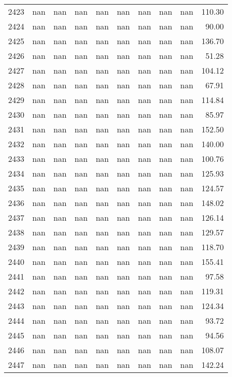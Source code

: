 \begin{tabular}{lrrrrrrrrr}
2423 & nan & nan & nan & nan & nan & nan & nan & nan & 110.30 \\
2424 & nan & nan & nan & nan & nan & nan & nan & nan & 90.00 \\
2425 & nan & nan & nan & nan & nan & nan & nan & nan & 136.70 \\
2426 & nan & nan & nan & nan & nan & nan & nan & nan & 51.28 \\
2427 & nan & nan & nan & nan & nan & nan & nan & nan & 104.12 \\
2428 & nan & nan & nan & nan & nan & nan & nan & nan & 67.91 \\
2429 & nan & nan & nan & nan & nan & nan & nan & nan & 114.84 \\
2430 & nan & nan & nan & nan & nan & nan & nan & nan & 85.97 \\
2431 & nan & nan & nan & nan & nan & nan & nan & nan & 152.50 \\
2432 & nan & nan & nan & nan & nan & nan & nan & nan & 140.00 \\
2433 & nan & nan & nan & nan & nan & nan & nan & nan & 100.76 \\
2434 & nan & nan & nan & nan & nan & nan & nan & nan & 125.93 \\
2435 & nan & nan & nan & nan & nan & nan & nan & nan & 124.57 \\
2436 & nan & nan & nan & nan & nan & nan & nan & nan & 148.02 \\
2437 & nan & nan & nan & nan & nan & nan & nan & nan & 126.14 \\
2438 & nan & nan & nan & nan & nan & nan & nan & nan & 129.57 \\
2439 & nan & nan & nan & nan & nan & nan & nan & nan & 118.70 \\
2440 & nan & nan & nan & nan & nan & nan & nan & nan & 155.41 \\
2441 & nan & nan & nan & nan & nan & nan & nan & nan & 97.58 \\
2442 & nan & nan & nan & nan & nan & nan & nan & nan & 119.31 \\
2443 & nan & nan & nan & nan & nan & nan & nan & nan & 124.34 \\
2444 & nan & nan & nan & nan & nan & nan & nan & nan & 93.72 \\
2445 & nan & nan & nan & nan & nan & nan & nan & nan & 94.56 \\
2446 & nan & nan & nan & nan & nan & nan & nan & nan & 108.07 \\
2447 & nan & nan & nan & nan & nan & nan & nan & nan & 142.24 \\

\end{tabular}
